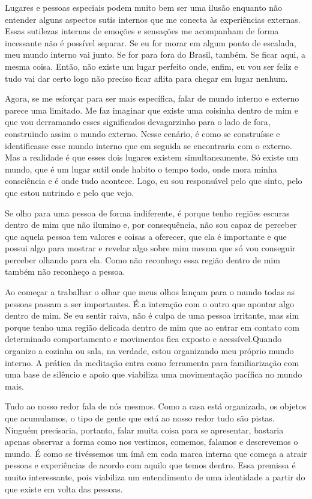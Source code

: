 Lugares e pessoas especiais podem muito bem ser uma ilusão enquanto não entender alguns aspectos sutis internos que me conecta às experiências externas. Essas sutilezas internas de emoções e sensações me acompanham de forma incessante não é possível separar. Se eu for morar em algum ponto de escalada, meu mundo interno vai junto. Se for para fora do Brasil, também. Se ficar aqui, a mesma coisa. Então, não existe um lugar perfeito onde, enfim, eu vou ser feliz e tudo vai dar certo logo não preciso ficar aflita para chegar em lugar nenhum.

Agora, se me esforçar para ser mais específica, falar de mundo interno e externo parece uma limitado. Me faz imaginar que existe uma coisinha dentro de mim e que vou derramando esses significados devagarzinho para o lado de fora, construindo assim o mundo externo. Nesse cenário, é como se construísse e identificasse esse mundo interno que em seguida se encontraria com o externo. Mas a realidade é que esses dois lugares existem simultaneamente. Só existe um mundo, que é um lugar sutil onde habito o tempo todo, onde mora minha consciência e é onde tudo acontece. Logo, eu sou responsável pelo que sinto, pelo que estou nutrindo e pelo que vejo. 

Se olho para uma pessoa de forma indiferente, é porque tenho regiões escuras dentro de mim que não ilumino e, por consequência, não sou capaz de perceber que aquela pessoa tem valores e coisas a oferecer, que ela é importante e que possui algo para mostrar e revelar algo sobre mim mesma que só vou conseguir perceber olhando para ela. Como não reconheço essa região dentro de mim também não reconheço a pessoa. 

Ao começar a trabalhar o olhar que meus olhos lançam para o mundo todas as pessoas passam a ser importantes. É a interação com o outro que apontar algo dentro de mim. Se eu sentir raiva, não é culpa de uma pessoa irritante, mas sim porque tenho uma região delicada dentro de mim que ao entrar em contato com determinado comportamento e movimentos fica exposto e acessível.Quando organizo a cozinha ou sala, na verdade, estou organizando meu próprio mundo interno. A prática da meditação entra como ferramenta para familiarização com uma base de silêncio e apoio que viabiliza uma movimentação pacífica no mundo mais. 

Tudo ao nosso redor fala de nós mesmos. Como a casa está organizada, os objetos que acumulamos, o tipo de gente que está ao nosso redor tudo são pistas. Ninguém precisaria, portanto, falar muita coisa para se apresentar, bastaria apenas observar a forma como nos vestimos, comemos, falamos e descrevemos o mundo. É como se tivéssemos um ímã em cada marca interna que começa a atrair pessoas e experiências de acordo com aquilo que temos dentro. Essa premissa é muito interessante, pois viabiliza um entendimento de uma identidade a partir do que existe em volta das pessoas. 

